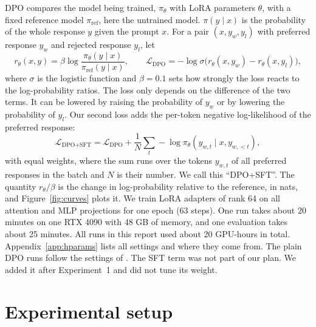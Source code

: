 \documentclass{article}
\begin{document}
DPO \cite{dpo} compares the model being trained, $\pi_\theta$ with LoRA parameters $\theta$, with a fixed reference model $\pi_{\text{ref}}$, here the untrained model. $\pi(y\mid x)$ is the probability of the whole response $y$ given the prompt $x$. For a pair $(x, y_w, y_l)$ with preferred response $y_w$ and rejected response $y_l$, let
\begin{equation}
r_\theta(x,y) = \beta \log \frac{\pi_\theta(y\mid x)}{\pi_{\text{ref}}(y\mid x)}, \qquad
\mathcal{L}_{\text{DPO}} = -\log \sigma\big(r_\theta(x,y_w) - r_\theta(x,y_l)\big),
\end{equation}
where $\sigma$ is the logistic function and $\beta=0.1$ sets how strongly the loss reacts to the log-probability ratios. The loss only depends on the difference of the two terms. It can be lowered by raising the probability of $y_w$ or by lowering the probability of $y_l$. Our second loss adds the per-token negative log-likelihood of the preferred response:
\begin{equation}
\mathcal{L}_{\text{DPO+SFT}} = \mathcal{L}_{\text{DPO}} + \frac{1}{N}\sum_{t} -\log \pi_\theta(y_{w,t}\mid x, y_{w,<t}),
\end{equation}
with equal weights, where the sum runs over the tokens $y_{w,t}$ of all preferred responses in the batch and $N$ is their number. We call this ``DPO+SFT''. The quantity $r_\theta/\beta$ is the change in log-probability relative to the reference, in nats, and Figure~\ref{fig:curves} plots it. We train LoRA adapters of rank 64 on all attention and MLP projections for one epoch (63 steps). One run takes about 20 minutes on one RTX 4090 with 48 GB of memory, and one evaluation takes about 25 minutes. All runs in this report used about 20 GPU-hours in total. Appendix~\ref{app:hparams} lists all settings and where they come from. The plain DPO runs follow the settings of \cite{goalgoal}. The SFT term was not part of our plan. We added it after Experiment~1 and did not tune its weight.

\section{Experimental setup}
\end{document}
